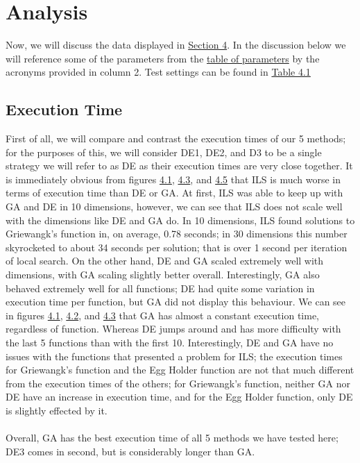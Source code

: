 \documentclass[paper=a4, fontsize=11pt]{scrartcl} %
\numberwithin{equation}{section} %
\numberwithin{figure}{section} %
\numberwithin{table}{section} %
\begin{document}
	
\section{Analysis} \label{S3}
	Now, we will discuss the data displayed in \hyperref[S4]{Section 4}. In the discussion below we will reference some of the parameters from the \hyperref[T21]{table of parameters} by the acronyms provided in column 2. Test settings can be found in \hyperref[T41]{Table 4.1} \\
	
	\subsection{Execution Time}
		First of all, we will compare and contrast the execution times of our 5 methods; for the purposes of this, we will consider DE1, DE2, and D3 to be a single strategy we will refer to as DE as their execution times are very close together. It is immediately obvious from figures \hyperref[F_10]{4.1}, \hyperref[F_20_ILS]{4.3}, and \hyperref[F_30_ILS]{4.5} that ILS is much worse in terms of execution time than DE or GA. At first, ILS was able to keep up with GA and DE in 10 dimensions, however, we can see that ILS does not scale well with the dimensions like DE and GA do. In 10 dimensions, ILS found solutions to Griewangk's function in, on average, 0.78 seconds; in 30 dimensions this number skyrocketed to about 34 seconds per solution; that is over 1 second per iteration of local search. On the other hand, DE and GA scaled extremely well with dimensions, with GA scaling slightly better overall. Interestingly, GA also behaved extremely well for all functions; DE had quite some variation in execution time per function, but GA did not display this behaviour. We can see in figures \hyperref[F_10]{4.1}, \hyperref[F_20]{4.2}, and \hyperref[F_30]{4.3} that GA has almost a constant execution time, regardless of function. Whereas DE jumps around and has more difficulty with the last 5 functions than with the first 10. Interestingly, DE and GA have no issues with the functions that presented a problem for ILS; the execution times for Griewangk's function and the Egg Holder function are not that much different from the execution times of the others; for Griewangk's function, neither GA nor DE have an increase in execution time, and for the Egg Holder function, only DE is slightly effected by it.\\ 
		\\ Overall, GA has the best execution time of all 5 methods we have tested here; DE3 comes in second, but is considerably longer than GA.\\
	
\end{document}
